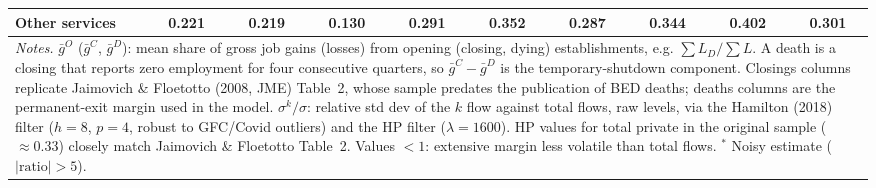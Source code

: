 \documentclass[authoryear, review, 12pt]{elsarticle}
\begin{document}
\begin{table}[H]
\begin{tabular}{lccccccccc}
Other services & 0.221 & 0.219 & 0.130 & 0.291 & 0.352 & 0.287 & 0.344 & 0.402 & 0.301 \\
\midrule
\multicolumn{10}{p{0.98\linewidth}}{\footnotesize \textit{Notes.} $\bar{g}^O$ ($\bar{g}^C$, $\bar{g}^D$): mean share of gross job gains (losses) from opening (closing, dying) establishments, e.g. $\sum L_D/\sum L$. A death is a closing that reports zero employment for four consecutive quarters, so $\bar{g}^C-\bar{g}^D$ is the temporary-shutdown component. Closings columns replicate Jaimovich \& Floetotto (2008, JME) Table~2, whose sample predates the publication of BED deaths; deaths columns are the permanent-exit margin used in the model. $\sigma^k/\sigma$: relative std dev of the $k$ flow against total flows, raw levels, via the Hamilton (2018) filter ($h{=}8$, $p{=}4$, robust to GFC/Covid outliers) and the HP filter ($\lambda{=}1600$). HP values for total private in the original sample ($\approx 0.33$) closely match Jaimovich \& Floetotto Table~2. Values $<1$: extensive margin less volatile than total flows. $^{*}$ Noisy estimate ($|\text{ratio}|>5$).} \\
\bottomrule
\end{tabular}
\end{table}
	
\end{document}

